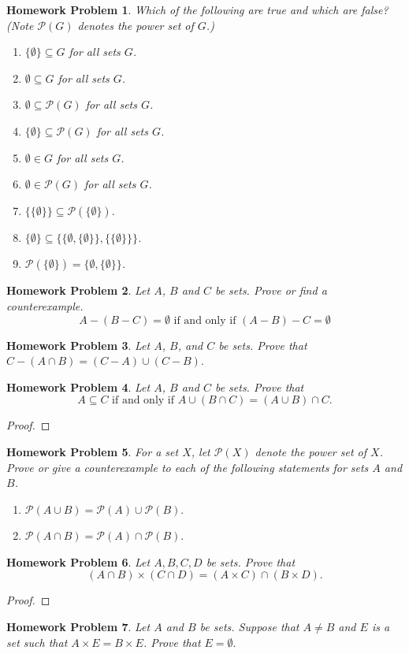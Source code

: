 \documentclass{article}
\newtheorem{hw}{Homework Problem}
\newcommand{\bp}{\begin{proof}}
\newcommand{\ep}{\end{proof}}
\begin{document}
	\begin{hw}
		Which of the following are true and which are false?  (Note $\mathcal{P}(G)$ denotes the power set of $G$.)
		\begin{enumerate}
			\item $\{ \emptyset \} \subseteq G$ for all sets $G$.
			\item $ \emptyset \subseteq G$ for all sets $G$.
			\item $ \emptyset \subseteq \mathcal{P}(G)$ for all sets $G$.
			\item $ \{\emptyset\} \subseteq \mathcal{P}(G)$ for all sets $G$.
			\item $ \emptyset \in G$ for all sets $G$.
			\item $ \emptyset \in \mathcal{P}(G)$ for all sets $G$.
			\item $\{ \{ \emptyset \} \} \subseteq \mathcal{P}( \{\emptyset\})$.
			\item $\{ \emptyset \} \subseteq \{ \{ \emptyset, \{ \emptyset \} \}, \{ \{ \emptyset \} \} \}$.
			\item $\mathcal{P}(\{ \emptyset \}) = \{ \emptyset ,  \{ \emptyset \} \}$.
		\end{enumerate}
	\end{hw}
	\begin{hw}
		Let $A$, $B$ and $C$ be sets. Prove or find a counterexample.
		$$A-(B-C) = \emptyset \textrm{ if and only if } (A-B)-C = \emptyset$$
	\end{hw}
	\begin{hw}
		Let $A$, $B$, and $C$ be sets.  \newline Prove that $C - (A\cap B) = (C-A) \cup (C-B).$
	\end{hw}
	\begin{hw}
		Let $A$, $B$ and $C$ be sets. Prove that
		$$ A \subseteq C  \textrm { if and only if  }   A\cup (B \cap C) = (A \cup B) \cap C.$$
	\end{hw}
	\bp
	\ep
	\begin{hw}
		For a set $X$, let $\mathcal{P}(X)$ denote the power set of $X$. \newline  Prove or give a counterexample to each of the following statements for sets $A$ and $B$.
	\end{hw}
	\begin{enumerate}
		\item  $\mathcal{P}(A \cup B) = \mathcal{P}(A) \cup \mathcal{P}(B).$
		\item   $\mathcal{P}(A \cap B) = \mathcal{P}(A) \cap \mathcal{P}(B).$
	\end{enumerate}
	\begin{hw}
		Let $A, B, C, D$ be sets. Prove that $$(A \cap B) \times (C \cap D) = (A \times C) \cap (B \times D).$$
	\end{hw}
	\bp
	\ep
	\begin{hw}
		Let $A$ and $B$ be sets. Suppose that $A \neq B$ and $E$ is a set such that $A \times E = B \times E$.
		Prove that $E =\emptyset.$
	\end{hw}
\end{document}
